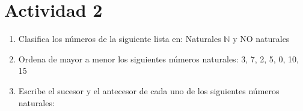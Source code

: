 \documentclass[10pt,twoside]{article}
\begin{document}
\section*{Actividad 2}
\begin{enumerate}
\item Clasifica los números de la siguiente lista en: Naturales $\mathbb{N}$ y NO naturales
\begin{enumerate}
\end{enumerate}
\item Ordena de mayor a menor los siguientes números naturales: 3, 7, 2, 5, 0, 10, 15
\item Escribe el sucesor y el antecesor de cada uno de los siguientes números naturales:
\begin{enumerate}
\end{enumerate}
\end{enumerate}
\end{document}
